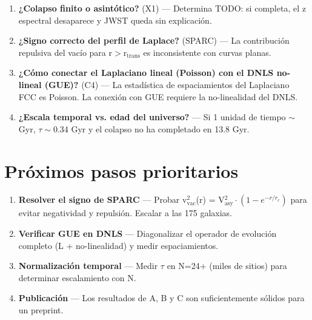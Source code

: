\documentclass[12pt]{article}
\begin{document}
\begin{enumerate}
\item \textbf{¿Colapso finito o asintótico?} (X1) --- Determina TODO: si completa, el z espectral desaparece y JWST queda sin explicación.
\item \textbf{¿Signo correcto del perfil de Laplace?} (SPARC) --- La contribución repulsiva del vacío para r$>$r$_{\text{trans}}$ es inconsistente con curvas planas.
\item \textbf{¿Cómo conectar el Laplaciano lineal (Poisson) con el DNLS no-lineal (GUE)?} (C4) --- La estadística de espaciamientos del Laplaciano FCC es Poisson. La conexión con GUE requiere la no-linealidad del DNLS.
\item \textbf{¿Escala temporal vs. edad del universo?} --- Si 1 unidad de tiempo $\sim$ Gyr, $\tau\sim$0.34 Gyr y el colapso no ha completado en 13.8 Gyr.
\end{enumerate}

\section{Próximos pasos prioritarios}

\begin{enumerate}
\item \textbf{Resolver el signo de SPARC} --- Probar v$_{\text{vac}}^2$(r) = V$_{\text{asy}}^2 \cdot (1-e^{-r/r_c})$ para evitar negatividad y repulsión. Escalar a las 175 galaxias.
\item \textbf{Verificar GUE en DNLS} --- Diagonalizar el operador de evolución completo (L + no-linealidad) y medir espaciamientos.
\item \textbf{Normalización temporal} --- Medir $\tau$ en N=24+ (miles de sitios) para determinar escalamiento con N.
\item \textbf{Publicación} --- Los resultados de A, B y C son suficientemente sólidos para un preprint.
\end{enumerate}
\end{document}
